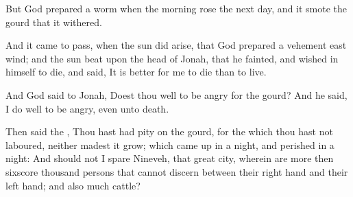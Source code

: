 \verse But God prepared a worm when the morning rose the next day, and it smote the gourd that it withered.

\verse And it came to pass, when the sun did arise, that God prepared a vehement east wind; and the sun beat upon the head of Jonah, that he fainted, and wished in himself to die, and said, It is better for me to die than to live.

\verse And God said to Jonah, Doest thou well to be angry for the gourd?  And he said, I do well to be angry, even unto death.

\verse Then said the \LORD, Thou hast had pity on the gourd, for the which thou hast not laboured, neither madest it grow; which came up in a night, and perished in a night: \verse And should not I spare Nineveh, that great city, wherein are more then sixscore thousand persons that cannot discern between their right hand and their left hand; and also much cattle?

